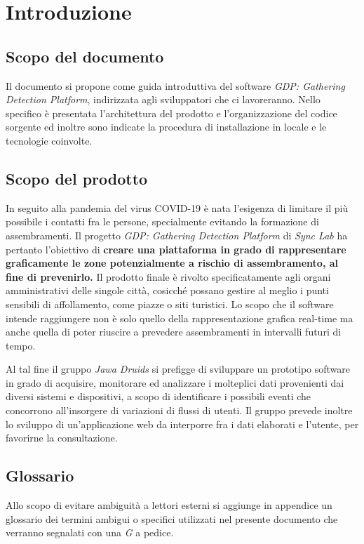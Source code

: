 \chapter{Introduzione}\label{Introduzione}

\section{Scopo del documento}\label{IntroduzioneScopoDelDocumento}
Il documento si propone come guida introduttiva del software \textit{GDP: Gathering Detection Platform}, indirizzata agli sviluppatori che ci lavoreranno. Nello specifico è presentata l'architettura del prodotto e l'organizzazione del codice sorgente ed inoltre sono indicate la procedura di installazione in locale e le tecnologie coinvolte.
\section{Scopo del prodotto}\label{ScopoDelProdotto}
In seguito alla pandemia del virus COVID-19 è nata l'esigenza di limitare il più possibile i contatti fra le persone, specialmente evitando la formazione di assembramenti. Il progetto \textit{GDP: Gathering Detection Platform} di \textit{Sync Lab} ha pertanto l'obiettivo di \textbf{creare una piattaforma in grado di rappresentare graficamente le zone potenzialmente a rischio di assembramento, al fine di prevenirlo.}
Il prodotto finale è rivolto specificatamente agli organi amministrativi delle singole città, cosicché possano gestire al meglio i punti sensibili di affollamento, come piazze o siti turistici.
Lo scopo che il software intende raggiungere non è solo quello della rappresentazione grafica real-time ma anche quella di poter riuscire a prevedere assembramenti in intervalli futuri di tempo.

Al tal fine il gruppo \textit{Jawa Druids} si prefigge di sviluppare un prototipo software in grado di acquisire, monitorare ed analizzare i molteplici dati provenienti dai diversi sistemi e dispositivi, a scopo di identificare i possibili eventi che concorrono all’insorgere di variazioni di flussi di utenti. Il gruppo prevede inoltre lo sviluppo di un'applicazione web da interporre fra i dati elaborati e l'utente, per favorirne la consultazione.
\section{Glossario}\label{1.3}
Allo scopo di evitare ambiguità a lettori esterni si aggiunge in appendice un glossario dei
termini ambigui o specifici utilizzati nel presente documento che verranno segnalati con una \textit{G} a pedice.
